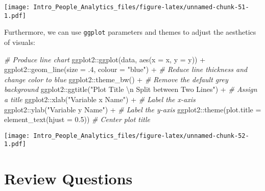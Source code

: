 \documentclass[
]{book}
\newenvironment{Shaded}{\begin{snugshade}}{\end{snugshade}}
\newcommand{\AttributeTok}[1]{\textcolor[rgb]{0.77,0.63,0.00}{#1}}
\newcommand{\CommentTok}[1]{\textcolor[rgb]{0.56,0.35,0.01}{\textit{#1}}}
\newcommand{\DecValTok}[1]{\textcolor[rgb]{0.00,0.00,0.81}{#1}}
\newcommand{\FloatTok}[1]{\textcolor[rgb]{0.00,0.00,0.81}{#1}}
\newcommand{\FunctionTok}[1]{\textcolor[rgb]{0.00,0.00,0.00}{#1}}
\newcommand{\NormalTok}[1]{#1}
\newcommand{\SpecialCharTok}[1]{\textcolor[rgb]{0.00,0.00,0.00}{#1}}
\newcommand{\StringTok}[1]{\textcolor[rgb]{0.31,0.60,0.02}{#1}}
\begin{document}
\texttt{[image: Intro\_People\_Analytics\_files/figure-latex/unnamed-chunk-51-1.pdf]}

Furthermore, we can use \texttt{ggplot} parameters and themes to adjust the aesthetics of visuals:

\begin{Shaded}
\begin{Highlighting}[]
\CommentTok{\# Produce line chart}
\NormalTok{ggplot2}\SpecialCharTok{::}\FunctionTok{ggplot}\NormalTok{(data, }\FunctionTok{aes}\NormalTok{(}\AttributeTok{x =}\NormalTok{ x, }\AttributeTok{y =}\NormalTok{ y)) }\SpecialCharTok{+}
\NormalTok{ggplot2}\SpecialCharTok{::}\FunctionTok{geom\_line}\NormalTok{(}\AttributeTok{size =}\NormalTok{ .}\DecValTok{4}\NormalTok{, }\AttributeTok{colour =} \StringTok{"blue"}\NormalTok{) }\SpecialCharTok{+} \CommentTok{\# Reduce line thickness and change color to blue}
\NormalTok{ggplot2}\SpecialCharTok{::}\FunctionTok{theme\_bw}\NormalTok{() }\SpecialCharTok{+} \CommentTok{\# Remove the default grey background}
\NormalTok{ggplot2}\SpecialCharTok{::}\FunctionTok{ggtitle}\NormalTok{(}\StringTok{"Plot Title }\SpecialCharTok{\textbackslash{}n}\StringTok{ Split between Two Lines"}\NormalTok{) }\SpecialCharTok{+} \CommentTok{\# Assign a title}
\NormalTok{ggplot2}\SpecialCharTok{::}\FunctionTok{xlab}\NormalTok{(}\StringTok{"Variable x Name"}\NormalTok{) }\SpecialCharTok{+} \CommentTok{\# Label the x{-}axis}
\NormalTok{ggplot2}\SpecialCharTok{::}\FunctionTok{ylab}\NormalTok{(}\StringTok{"Variable y Name"}\NormalTok{) }\SpecialCharTok{+} \CommentTok{\# Label the y{-}axis}
\NormalTok{ggplot2}\SpecialCharTok{::}\FunctionTok{theme}\NormalTok{(}\AttributeTok{plot.title =} \FunctionTok{element\_text}\NormalTok{(}\AttributeTok{hjust =} \FloatTok{0.5}\NormalTok{)) }\CommentTok{\# Center plot title}
\end{Highlighting}
\end{Shaded}

\texttt{[image: Intro\_People\_Analytics\_files/figure-latex/unnamed-chunk-52-1.pdf]}

\hypertarget{review-questions}{%
\section{Review Questions}\label{review-questions}}
\end{document}
